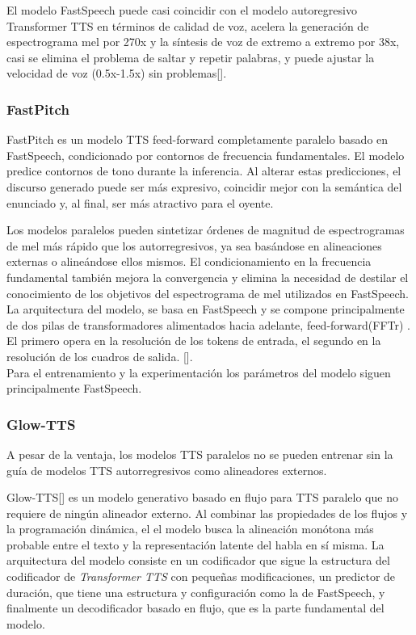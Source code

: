 El modelo FastSpeech puede casi coincidir con el modelo autoregresivo Transformer TTS en términos de calidad de voz, acelera la generación de espectrograma mel por 270x y la síntesis de voz de extremo a extremo por 38x, casi se elimina el problema de saltar y repetir palabras, y puede ajustar la velocidad de voz (0.5x-1.5x) sin problemas[\cite{ren2019fastspeech}].


\subsubsection{FastPitch}
FastPitch es un modelo TTS feed-forward completamente paralelo basado en FastSpeech, condicionado por contornos de frecuencia fundamentales. El modelo predice contornos de tono durante la inferencia. Al alterar estas predicciones, el discurso generado puede ser más expresivo, coincidir mejor con la semántica del enunciado y, al final, ser más atractivo para el oyente.

Los modelos paralelos pueden sintetizar órdenes de magnitud de espectrogramas de mel más rápido que los autorregresivos, ya sea basándose en alineaciones externas o alineándose ellos mismos. El condicionamiento en la frecuencia fundamental también mejora la convergencia y elimina la necesidad de destilar el conocimiento de los objetivos del espectrograma de mel utilizados en FastSpeech.\\


La arquitectura del modelo, se basa en FastSpeech y se compone principalmente de dos pilas de transformadores alimentados hacia adelante, feed-forward(FFTr) . El primero opera en la resolución de los tokens de entrada, el segundo en la resolución de los cuadros de salida.
[\cite{lancucki2021fastpitch}].\\

Para el entrenamiento y la experimentación los parámetros del modelo siguen principalmente FastSpeech.

\subsubsection{Glow-TTS}
A pesar de la ventaja, los modelos TTS paralelos no se pueden entrenar sin la guía de modelos TTS autorregresivos como alineadores externos. 

Glow-TTS[\cite{kim2020glow}] es un modelo generativo basado en flujo para TTS paralelo que no requiere de ningún alineador externo. Al combinar las propiedades de los flujos y la programación dinámica, el el modelo busca la alineación monótona más probable entre el texto y la representación latente del habla en sí misma.
La arquitectura del modelo consiste en un codificador que sigue la estructura del codificador de \textit{Transformer TTS} con pequeñas modificaciones, un predictor de duración, que tiene una estructura y configuración como la de FastSpeech, y finalmente un decodificador basado en flujo, que es la parte fundamental del modelo.

